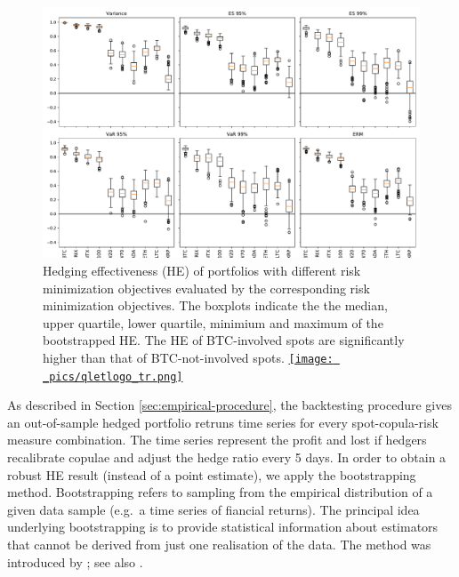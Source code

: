 \begin{figure}[t]
  \includegraphics[width=\textwidth]{_pics/HE_boxplot.pdf}
    \caption{Hedging effectiveness (HE) of portfolios with different risk minimization objectives evaluated by the corresponding risk minimization objectives.
              The boxplots indicate the the median, upper quartile, lower quartile, minimium and maximum of the bootstrapped HE.
              The HE of BTC-involved spots are significantly higher than that of BTC-not-involved spots.
    \href{http://www.quantlet.com/}{\texttt{[image: \_pics/qletlogo\_tr.png]}} }
  \label{fig:HEboxplot}
  \end{figure}



As described in Section \ref{sec:empirical-procedure}, the backtesting procedure gives
an out-of-sample hedged portfolio retruns time series for every spot-copula-risk measure combination. 
The time series represent the profit and lost if hedgers recalibrate copulae and adjust the hedge ratio every 5 days.  
In order to obtain a robust HE result (instead of a point estimate), we apply the bootstrapping method.
Bootstrapping refers to sampling from the empirical distribution of a
given data sample (e.g.\ a time series of fiancial returns). The
principal idea underlying bootstrapping is to provide statistical
information about estimators that cannot be derived from just one
realisation of the data. The method was introduced by
\cite{Efron1979}; see also \citep{efron1994introduction, davison1997bootstrap}. 

